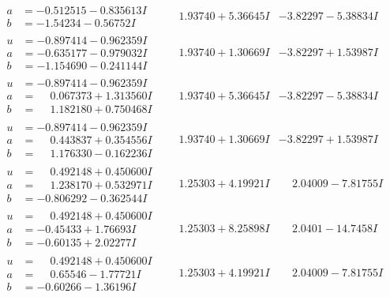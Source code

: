 \documentclass[1p]{elsarticle_modified}
\theoremstyle{definition}
\begin{document}
$$\begin{array}{c|c|c}
\begin{aligned}
a &= -0.512515 - 0.835613 I \\
b &= -1.54234 - 0.56752 I\end{aligned}
 & \phantom{-}1.93740 + 5.36645 I & -3.82297 - 5.38834 I \\ \hline\begin{aligned}
u &= -0.897414 - 0.962359 I \\
a &= -0.635177 - 0.979032 I \\
b &= -1.154690 - 0.241144 I\end{aligned}
 & \phantom{-}1.93740 + 1.30669 I & -3.82297 + 1.53987 I \\ \hline\begin{aligned}
u &= -0.897414 - 0.962359 I \\
a &= \phantom{-}0.067373 + 1.313560 I \\
b &= \phantom{-}1.182180 + 0.750468 I\end{aligned}
 & \phantom{-}1.93740 + 5.36645 I & -3.82297 - 5.38834 I \\ \hline\begin{aligned}
u &= -0.897414 - 0.962359 I \\
a &= \phantom{-}0.443837 + 0.354556 I \\
b &= \phantom{-}1.176330 - 0.162236 I\end{aligned}
 & \phantom{-}1.93740 + 1.30669 I & -3.82297 + 1.53987 I \\ \hline\begin{aligned}
u &= \phantom{-}0.492148 + 0.450600 I \\
a &= \phantom{-}1.238170 + 0.532971 I \\
b &= -0.806292 - 0.362544 I\end{aligned}
 & \phantom{-}1.25303 + 4.19921 I & \phantom{-}2.04009 - 7.81755 I \\ \hline\begin{aligned}
u &= \phantom{-}0.492148 + 0.450600 I \\
a &= -0.45433 + 1.76693 I \\
b &= -0.60135 + 2.02277 I\end{aligned}
 & \phantom{-}1.25303 + 8.25898 I & \phantom{-}2.0401 - 14.7458 I \\ \hline\begin{aligned}
u &= \phantom{-}0.492148 + 0.450600 I \\
a &= \phantom{-}0.65546 - 1.77721 I \\
b &= -0.60266 - 1.36196 I\end{aligned}
 & \phantom{-}1.25303 + 4.19921 I & \phantom{-}2.04009 - 7.81755 I \\ \hline\begin{aligned}

\end{aligned}
\end{array}$$
\end{document}
